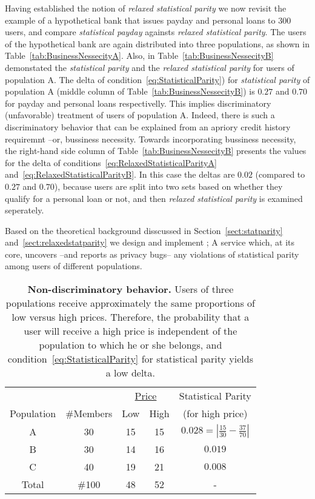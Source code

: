 Having established the notion of {\em relaxed statistical parity} we now revisit
the example of a hypothetical bank that issues payday and personal loans to 300
users, and compare {\em statistical payday} againsts {\em relaxed statistical
parity}. The users of the hypothetical bank are again distributed into three
populations, as shown in Table~\ref{tab:BusinessNessecityA}. Also, in
Table~\ref{tab:BusinessNessecityB} demonstated the {\em statistical parity}
and the {\em relaxed statistical parity} for users of population A. The delta
of condition~\ref{eq:StatisticalParity}) for {\em statistical parity} of
population A (middle column of Table~\ref{tab:BusinessNessecityB}) is $0.27$
and $0.70$ for payday and personal loans respectivelly. This implies
discriminatory (unfavorable) treatment of users of population A. Indeed, there
is such a discriminatory behavior that can be explained from an apriory
credit history requiremnt --or, bussiness necessity. Towards incorporating
bussiness necessity, the right-hand side column of
Table~\ref{tab:BusinessNessecityB} presents the values for the delta of
conditions~\ref{eq:RelaxedStatisticalParityA}
and~\ref{eq:RelaxedStatisticalParityB}. In this case the deltas are $0.02$
(compared to $0.27$ and $0.70$), because users are split into two sets
based on whether they qualify for a personal loan or not, and then
{\em relaxed statistical parity} is examined seperately.

Based on the theoretical background disscussed in Section~\ref{sect:statparity}
and~\ref{sect:relaxedstatparity} we design and implement \sysname; A service
which, at its core, uncovers --and reports as privacy bugs-- any violations
of statistical parity among users of different populations.

\begin{table}[t]
{\scriptsize
  \renewcommand{\arraystretch}{1.5}
  \begin{tabular}{ c | c | c  c | c }
    & & \multicolumn{2}{|c|}{\underline{Price}} &  Statistical Parity\\
    Population & \#Members & Low & High & (for high price) \\
    \hline
    A & 30 &  15 & 15 & $0.028 = | \frac{15}{30} - \frac{37}{70}|$ \\
    B & 30 &  14 & 16 & $0.019$ \\
    C & 40 &  19 & 21 & $0.008$ \\
    \hline
    Total & \#100 & 48 & 52 & - \\
  \end{tabular}
  \caption{{\bf Non-discriminatory behavior.} Users of three populations receive approximately
  the same proportions of low versus high prices. Therefore, the probability that a user
  will receive a high price is independent of the population to which he or she belongs,
  and condition~\ref{eq:StatisticalParity} for statistical parity yields a low delta.}
  \label{tab:NonDiscriminationExample}
}
\end{table}

